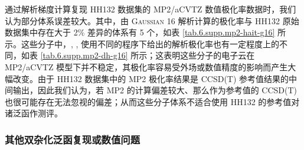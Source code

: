 \begin{table}[!ht]
\centering
\caption[HH132 不同程序解析极化率误差大的体系]{HH132 数据集不同程序 (\textsc{dh} 与 \textsc{Gaussian 16}) 解析极化率相对误差超过 0.5\% 的体系、及其数值与误差${}^a$。}
\label{tab.6.supp.mp2-dh-g16}
\end{table}

通过解析梯度计算复现 HH132 数据集的 MP2/aCVTZ 数值极化率数据时，我们认为部分体系误差较大。其中，由 \textsc{Gaussian 16} 解析计算的极化率与 HH132 原始数据集中存在大于 2\% 差异的体系有 5 个，如表 \ref{tab.6.supp.mp2-hait-g16} 所示。这些分子中，, ,  使用不同的程序下给出的解析极化率也有一定程度上的不同，如表 \ref{tab.6.supp.mp2-dh-g16} 所示；这表明这些分子的电子云在 MP2/aCVTZ 模型下并不稳定，其极化率容易受外场或数值精度的影响而产生大幅改变。由于 HH132 数据集中的 MP2 极化率结果是 CCSD(T) 参考值结果的中间输出，因此我们认为，若 MP2 的计算偏差较大、那么作为参考值的 CCSD(T) 也很可能存在无法忽视的偏差；从而这些分子体系不适合使用 HH132 的参考值对诸泛函作测评。

\subsubsection{其他双杂化泛函复现或数值问题}

